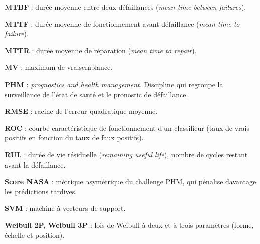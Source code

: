 {\textbf{MTBF} : durée moyenne entre deux défaillances (\emph{mean time between failures}).

\textbf{MTTF} : durée moyenne de fonctionnement avant défaillance (\emph{mean time to failure}).

\textbf{MTTR} : durée moyenne de réparation (\emph{mean time to repair}).

\textbf{MV} : maximum de vraisemblance.

\textbf{PHM} : \emph{prognostics and health management}. Discipline qui regroupe la surveillance de l'état de santé et le pronostic de défaillance.

\textbf{RMSE} : racine de l'erreur quadratique moyenne.

\textbf{ROC} : courbe caractéristique de fonctionnement d'un classifieur (taux de vrais positifs en fonction du taux de faux positifs).

\textbf{RUL} : durée de vie résiduelle (\emph{remaining useful life}), nombre de cycles restant avant la défaillance.

\textbf{Score NASA} : métrique asymétrique du challenge PHM, qui pénalise davantage les prédictions tardives.

\textbf{SVM} : machine à vecteurs de support.

\textbf{Weibull 2P, Weibull 3P} : lois de Weibull à deux et à trois paramètres (forme, échelle et position).
}
